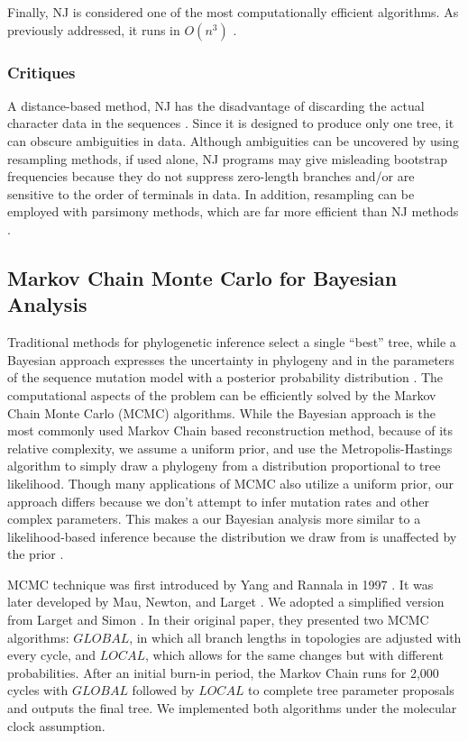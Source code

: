 \documentclass[10pt,twocolumn]{article}
\begin{document}
Finally, NJ is considered one of the most computationally efficient algorithms. As previously addressed, it runs in $O(n^3)$ \cite{desper2002fast}.

\subsubsection*{Critiques}
A distance-based method, NJ has the disadvantage of discarding the actual character data in the sequences \cite{brinkman2001phylogenetic}. Since it is designed to produce only one tree, it can obscure ambiguities in data. Although ambiguities can be uncovered by using resampling methods, if used alone, NJ programs may give misleading bootstrap frequencies because they do not suppress zero-length branches and/or are sensitive to the order of terminals in data. In addition, resampling can be employed with parsimony methods, which are far more efficient than NJ methods \cite{farris1996parsimony}.

\subsection*{Markov Chain Monte Carlo for Bayesian Analysis}
Traditional methods for phylogenetic inference select a single ``best'' tree, while a Bayesian approach expresses the uncertainty in phylogeny and in the parameters of the sequence mutation model with a posterior probability distribution \cite{larget1999markov}. The computational aspects of the problem can be efficiently solved by the Markov Chain Monte Carlo (MCMC) algorithms. While the Bayesian approach is the most commonly used Markov Chain based reconstruction method, because of its relative complexity, we assume a uniform prior, and use the Metropolis-Hastings algorithm to simply draw a phylogeny from a distribution proportional to tree likelihood. Though many applications of MCMC also utilize a uniform prior, our approach differs because we don't attempt to infer mutation rates and other complex parameters. This makes a our Bayesian analysis more similar to a likelihood-based inference because the distribution we draw from is unaffected by the prior \cite{qian2003monte}.

MCMC technique was first introduced by Yang and Rannala in 1997 \cite{yang1997bayesian}. It was later developed by Mau, Newton, and Larget \cite{mau1999bayesian}. We adopted a simplified version from Larget and Simon \cite{larget1999markov}. In their original paper, they presented two MCMC algorithms: $GLOBAL$, in which all branch lengths in topologies are adjusted with every cycle, and $LOCAL$, which allows for the same changes but with different probabilities. After an initial burn-in period, the Markov Chain runs for 2,000 cycles with $GLOBAL$ followed by $LOCAL$ to complete tree parameter proposals and outputs the final tree. We implemented both algorithms under the molecular clock assumption.
\end{document}
